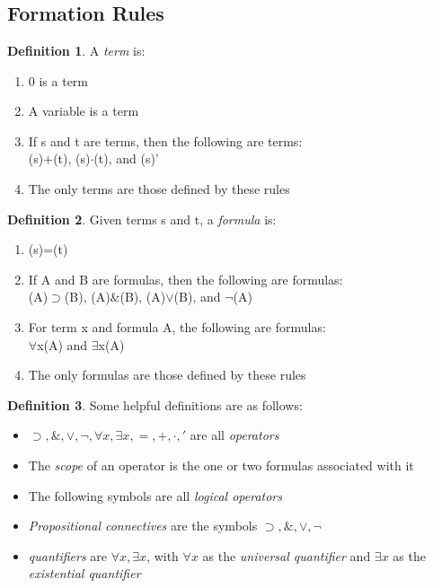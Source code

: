 \documentclass{article}
\theoremstyle{definition}
\newtheorem{definition}{Definition}
\def\itemrange#1{%
\addtocounter{enumi}{1}%
\edef\labelenumi{\theenumi--\noexpand\theenumi.}%
\addtocounter{enumi}{-2}%
\addtocounter{enumi}{#1}%
\item
\def\labelenumi{\theenumi}}
\renewcommand{\land}{\&}
\newcommand{\implies}{\supset}
\begin{document}
\setcounter{section}{3}
\section{}

\setcounter{subsection}{16}
\subsection{Formation Rules}

\begin{definition}
    A \textit{term} is:
    \begin{enumerate}
        \item 0 is a term
        \item A variable is a term
        \itemrange{3} If s and t are terms, then the following are terms:\\
            (s)$+$(t), (s)$\cdot$(t), and (s)'
        \item The only terms are those defined by these rules
    \end{enumerate}
\end{definition}

\begin{definition}
    Given terms s and t, a \textit{formula} is:
    \begin{enumerate}
        \item (s)=(t)
        \itemrange{4} If A and B are formulas, then the following are formulas:\\
            (A)$\implies$(B), (A)$\land$(B), (A)$\lor$(B), and $\neg$(A)
        \itemrange{4} For term x and formula A, the following are formulas:\\
            $\forall$x(A) and $\exists$x(A)
        \item The only formulas are those defined by these rules
    \end{enumerate}
\end{definition}

\begin{definition}
    Some helpful definitions are as follows:
    \begin{itemize}
        \item $\implies, \land, \lor, \neg, \forall x, \exists x, =, +, \cdot, '$ are all \emph{operators}
        \item The \emph{scope} of an operator is the one or two formulas associated with it 
        \item The following symbols are all \emph{logical operators}
        \item \emph{Propositional connectives} are the symbols $\implies, \land, \lor, \neg$
        \item \emph{quantifiers} are $\forall x, \exists x$, with $\forall x$ as the \emph{universal quantifier} and $\exists x$ as the \emph{existential quantifier}
    \end{itemize}
\end{definition}
\end{document}
